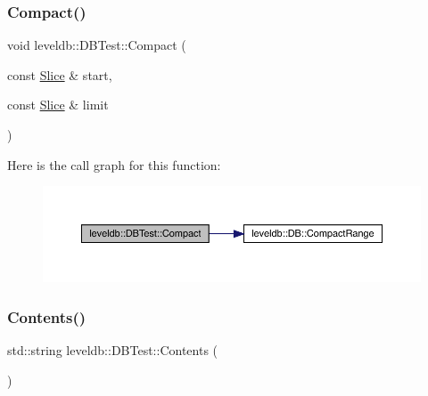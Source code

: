 \subsubsection{\texorpdfstring{Compact()}{Compact()}}
{\footnotesize\ttfamily void leveldb\+::\+D\+B\+Test\+::\+Compact (\begin{DoxyParamCaption}\item[{const \mbox{\hyperlink{classleveldb_1_1_slice}{Slice}} \&}]{start,  }\item[{const \mbox{\hyperlink{classleveldb_1_1_slice}{Slice}} \&}]{limit }\end{DoxyParamCaption})\hspace{0.3cm}{\ttfamily [inline]}}

Here is the call graph for this function\+:
\nopagebreak
\begin{figure}[H]
\begin{center}
\leavevmode
\includegraphics[width=350pt]{classleveldb_1_1_d_b_test_a9b6cd10fd7c8fc54127b0c40c0ac7db5_cgraph}
\end{center}
\end{figure}
\mbox{\label{classleveldb_1_1_d_b_test_a3cf871664bd22c6ed2d6c2a8834b49fc}} 
\subsubsection{\texorpdfstring{Contents()}{Contents()}}
{\footnotesize\ttfamily std\+::string leveldb\+::\+D\+B\+Test\+::\+Contents (\begin{DoxyParamCaption}{ }\end{DoxyParamCaption})\hspace{0.3cm}{\ttfamily [inline]}}

